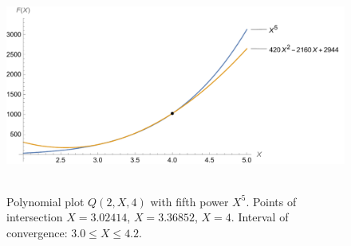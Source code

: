 ﻿\begin{figure}[H]
    \centering
    \includegraphics[width=1\textwidth]{sections/images/04_plots_polynomial_q2_n4_with_fifth}
    ~\caption{Polynomial plot $Q(2, X, 4)$ with fifth power $X^5$.
    Points of intersection $X=3.02414$, $X=3.36852$, $X=4$.
    Interval of convergence: $3.0 \leq X \leq 4.2$.
    }\label{fig:figure10}
\end{figure}
